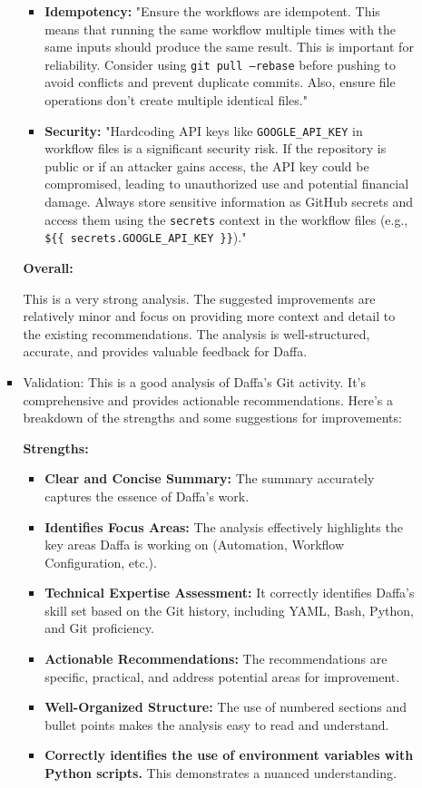 \documentclass{article}
\begin{document}
\begin{itemize}
\begin{itemize}
\begin{itemize}
\begin{itemize}
    \item \textbf{Idempotency:} "Ensure the workflows are idempotent. This means that running the same workflow multiple times with the same inputs should produce the same result.  This is important for reliability.  Consider using \texttt{git pull --rebase} before pushing to avoid conflicts and prevent duplicate commits. Also, ensure file operations don't create multiple identical files."

    \item \textbf{Security:} "Hardcoding API keys like \texttt{GOOGLE\_API\_KEY} in workflow files is a significant security risk. If the repository is public or if an attacker gains access, the API key could be compromised, leading to unauthorized use and potential financial damage. Always store sensitive information as GitHub secrets and access them using the \texttt{secrets} context in the workflow files (e.g., \texttt{\$\{\{ secrets.GOOGLE\_API\_KEY \}\}})."
\end{itemize}

\textbf{Overall:}

This is a very strong analysis. The suggested improvements are relatively minor and focus on providing more context and detail to the existing recommendations. The analysis is well-structured, accurate, and provides valuable feedback for Daffa.

            \item Validation: This is a good analysis of Daffa's Git activity. It's comprehensive and provides actionable recommendations. Here's a breakdown of the strengths and some suggestions for improvements:

\textbf{Strengths:}

\begin{itemize}
    \item \textbf{Clear and Concise Summary:} The summary accurately captures the essence of Daffa's work.
    \item \textbf{Identifies Focus Areas:}  The analysis effectively highlights the key areas Daffa is working on (Automation, Workflow Configuration, etc.).
    \item \textbf{Technical Expertise Assessment:}  It correctly identifies Daffa's skill set based on the Git history, including YAML, Bash, Python, and Git proficiency.
    \item \textbf{Actionable Recommendations:} The recommendations are specific, practical, and address potential areas for improvement.
    \item \textbf{Well-Organized Structure:} The use of numbered sections and bullet points makes the analysis easy to read and understand.
    \item \textbf{Correctly identifies the use of environment variables with Python scripts.} This demonstrates a nuanced understanding.
\end{itemize}


\end{itemize}
\end{itemize}
\end{itemize}
\end{document}
